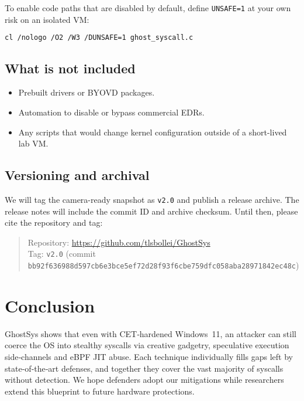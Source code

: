 \documentclass[11pt,letterpaper]{article}
\begin{document}
    \noindent
    To enable code paths that are disabled by default, define \texttt{UNSAFE=1} at your own risk on an isolated VM:
    \begin{lstlisting}[language=bash,basicstyle=\footnotesize\ttfamily]
    cl /nologo /O2 /W3 /DUNSAFE=1 ghost_syscall.c
    \end{lstlisting}

    \subsection{What is not included}
    \begin{itemize}
    \item Prebuilt drivers or BYOVD packages.
    \item Automation to disable or bypass commercial EDRs.
    \item Any scripts that would change kernel configuration outside of a short-lived lab VM.
    \end{itemize}

    \subsection{Versioning and archival}
    We will tag the camera-ready snapshot as \texttt{v2.0} and publish a release archive. The release notes will include the commit ID and archive checksum. Until then, please cite the repository and tag:
    \begin{quote}\footnotesize
    Repository: \url{https://github.com/tlsbollei/GhostSys} \\
    Tag: \texttt{v2.0} (commit \texttt{bb92f636988d597cb6e3bce5ef72d28f93f6cbe759dfc058aba28971842ec48c})
    \end{quote}

    \section{Conclusion}
    \label{sec:conclusion}
    GhostSys shows that even with CET‑hardened Windows 11, an attacker can still coerce the OS into stealthy syscalls via creative gadgetry, speculative execution side‑channels and eBPF JIT abuse. Each technique individually fills gaps left by state‑of‑the‑art defenses, and together they cover the vast majority of syscalls without detection. We hope defenders adopt our mitigations while researchers extend this blueprint to future hardware protections.
\end{document}
